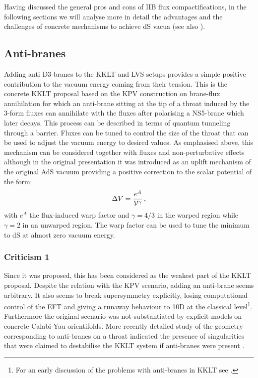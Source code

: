 \documentclass[11pt,a4paper]{article}
\newcommand{\be}{\begin{equation}}
\newcommand{\ee}{\end{equation}}
\newcommand{\vo}{\mathcal{V}}
\def\vo{{{\cal{V}}}}
\begin{document}
Having discussed the general pros and cons of IIB flux compactifications, in the following sections we will analyse more in detail the advantages and the challenges of concrete mechanisms to achieve dS vacua (see also \cite{Danielsson:2018ztv}).


\subsection{Anti-branes}
\label{Dbar}

Adding anti D3-branes to the KKLT and LVS setups provides a simple positive contribution to the vacuum energy coming from their tension. This is the concrete KKLT proposal based on the KPV construction \cite{Kachru:2002gs} on brane-flux annihilation for which an anti-brane sitting at the tip of a throat induced by the 3-form fluxes can annihilate with the fluxes after polarising a NS5-brane which later decays. This process can be described in terms of quantum tunneling through a barrier. Fluxes can be tuned to control the size of the throat that can be used to adjust the vacuum energy to desired values. As emphasised above, this mechanism can be considered together with fluxes and non-perturbative effects although in the original presentation it was introduced as an uplift mechanism of the original AdS vacuum providing a positive correction to the scalar potential of the form:
\be
\Delta V = \frac{e^A}{\vo^\gamma}\,,
\label{uplift}
\ee
with $e^A$ the flux-induced warp factor and $\gamma=4/3$ in the warped region while $\gamma=2$ in an unwarped region. The warp factor can be used to tune the minimum to dS at almost zero vacuum energy.

\subsubsection*{Criticism 1}

Since it was proposed, this has been considered as the weakest part of the KKLT proposal. Despite the relation with the KPV scenario, adding an anti-brane seems  arbitrary. It also seems to break supersymmetry explicitly, losing computational control of the EFT and giving a runaway behaviour to 10D at the classical level\footnote{For an early discussion of the problems with anti-branes in KKLT see \cite{Brustein:2004xn}.}. Furthermore the original scenario was not substantiated by explicit models on concrete Calabi-Yau orientifolds. More recently detailed study of the geometry corresponding to anti-branes on a throat indicated the presence of singularities that were claimed to destabilise the KKLT system if anti-branes were present \cite{Bena:2009xk, Bena:2012bk}.
\end{document}
